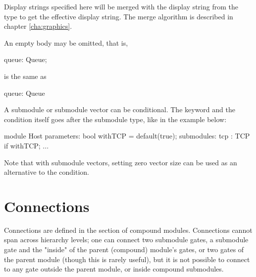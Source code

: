 Display strings specified here will be merged with the display string
from the type to get the effective display string. The merge algorithm is
described in chapter \ref{cha:graphics}.


An empty body may be omitted, that is,

\begin{ned}
      queue: Queue;
\end{ned}

is the same as

\begin{ned}
      queue: Queue {
      }
\end{ned}

A submodule or submodule vector can be conditional. The 
keyword and the condition itself goes after the submodule type, like in the
example below:

\begin{ned}
module Host
{
    parameters:
        bool withTCP = default(true);
    submodules:
        tcp : TCP if withTCP;
        ...
}
\end{ned}

Note that with submodule vectors, setting zero vector size can be used as an
alternative to the  condition.

\section{Connections}
\label{sec:ned-lang:connections}

Connections are defined in the  section of compound
modules. Connections cannot span across hierarchy levels; one can connect
two submodule gates, a submodule gate and the "inside" of the parent
(compound) module's gates, or two gates of the parent module (though this
is rarely useful), but it is not possible to connect to any gate outside the
parent module, or inside compound submodules.

